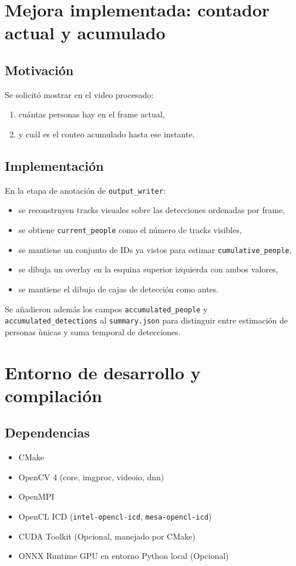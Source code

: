 \documentclass[11pt,a4paper]{article}
\begin{document}
\section{Mejora implementada: contador actual y acumulado}
\subsection{Motivaci\'on}
Se solicit\'o mostrar en el video procesado:
\begin{enumerate}[leftmargin=*]
  \item cu\'antas personas hay en el frame actual,
  \item y cu\'al es el conteo acumulado hasta ese instante.
\end{enumerate}

\subsection{Implementaci\'on}
En la etapa de anotaci\'on de \texttt{output\_writer}:
\begin{itemize}[leftmargin=*]
  \item se reconstruyen tracks visuales sobre las detecciones ordenadas por frame,
  \item se obtiene \texttt{current\_people} como el n\'umero de tracks visibles,
  \item se mantiene un conjunto de IDs ya vistos para estimar \texttt{cumulative\_people},
  \item se dibuja un overlay en la esquina superior izquierda con ambos valores,
  \item se mantiene el dibujo de cajas de detecci\'on como antes.
\end{itemize}

Se a\~nadieron adem\'as los campos \texttt{accumulated\_people} y \texttt{accumulated\_detections} al \texttt{summary.json} para distinguir entre estimaci\'on de personas \`unicas y suma temporal de detecciones.

\section{Entorno de desarrollo y compilaci\'on}
\subsection{Dependencias}
\begin{itemize}[leftmargin=*]
  \item CMake
  \item OpenCV 4 (core, imgproc, videoio, dnn)
  \item OpenMPI
  \item OpenCL ICD (\texttt{intel-opencl-icd}, \texttt{mesa-opencl-icd})
  \item CUDA Toolkit (Opcional, manejado por CMake)
  \item ONNX Runtime GPU en entorno Python local (Opcional)
\end{itemize}
\end{document}
